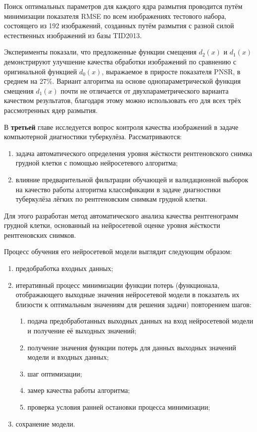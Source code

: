 Поиск оптимальных параметров для каждого ядра размытия проводится путём минимизации показателя RMSE по всем изображениях тестового набора, состоящего из 192 изображений, созданных путём размытия с разной силой естественных изображений из базы TID2013.

Эксперименты показали, что предложенные функции смещения $d_2\left(x\right)$ и $d_1\left(x\right)$ демонстрируют улучшение качества обработки изображений по сравнению с оригинальной функцией $d_0\left(x\right)$, выражаемое в приросте показателя PNSR, в среднем на 27\%. Вариант алгоритма на основе однопараметрической функция смещения $d_1\left(x\right)$ почти не отличается от двухпараметрического варианта качеством результатов, благодаря этому можно использовать его для всех трёх рассмотренных ядер размытия.


В {\textbf{третьей}} главе исследуется вопрос контроля качества изображений в задаче компьютерной диагностики туберкулёза. Рассматриваются:
\begin{enumerate}[beginpenalty=10000]
	\item задача автоматического определения уровня жёсткости рентгеновского снимка грудной клетки с помощью нейросетевого алгоритма;
	\item влияние предварительной фильтрации обучающей и валидационной выборок на качество работы алгоритма классификации в задаче диагностики туберкулёза лёгких по рентгеновским снимкам грудной клетки.
\end{enumerate}

Для этого разработан метод автоматического анализа качества рентгенограмм грудной клетки, основанный на нейросетевой оценке уровня жёсткости рентгеновских снимков.

Процесс обучения его нейросетевой модели выглядит следующим образом:
\begin{enumerate}[beginpenalty=10000]
	\item предобработка входных данных;
	\item итеративный процесс минимизации функции потерь (функционала, отображающего выходные значения нейросетевой модели в показатель их близости к оптимальным значениям для решения задачи) повторением шагов:
	\begin{enumerate}[beginpenalty=10000]
		\item подача предобработанных выходных данных на вход нейросетевой модели и получение её выходных значений;
		\item получение значения функции потерь для данных выходных значений модели и входных данных;
		\item шаг оптимизации;
		\item замер качества работы алгоритма;
		\item проверка условия ранней остановки процесса минимизации;
	\end{enumerate}
	\item сохранение модели.	
\end{enumerate}

